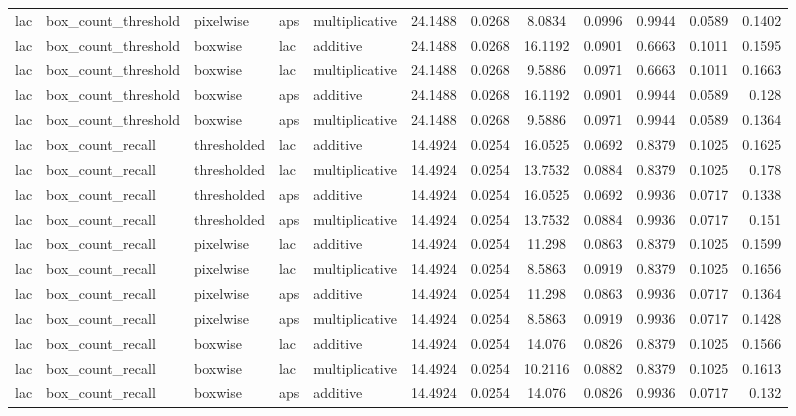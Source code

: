 \begin{table*}[htbp]
\begin{tabular}{@{}lllll rrcrrcr@{}}
lac & box\_count\_threshold & pixelwise & aps & multiplicative & 24.1488 & 0.0268 & 8.0834 & 0.0996 & 0.9944 & 0.0589 & 0.1402 \\
lac & box\_count\_threshold & boxwise & lac & additive & 24.1488 & 0.0268 & 16.1192 & 0.0901 & 0.6663 & 0.1011 & 0.1595 \\
lac & box\_count\_threshold & boxwise & lac & multiplicative & 24.1488 & 0.0268 & 9.5886 & 0.0971 & 0.6663 & 0.1011 & 0.1663 \\
lac & box\_count\_threshold & boxwise & aps & additive & 24.1488 & 0.0268 & 16.1192 & 0.0901 & 0.9944 & 0.0589 & 0.128 \\
lac & box\_count\_threshold & boxwise & aps & multiplicative & 24.1488 & 0.0268 & 9.5886 & 0.0971 & 0.9944 & 0.0589 & 0.1364 \\
lac & box\_count\_recall & thresholded & lac & additive & 14.4924 & 0.0254 & 16.0525 & 0.0692 & 0.8379 & 0.1025 & 0.1625 \\
lac & box\_count\_recall & thresholded & lac & multiplicative & 14.4924 & 0.0254 & 13.7532 & 0.0884 & 0.8379 & 0.1025 & 0.178 \\
lac & box\_count\_recall & thresholded & aps & additive & 14.4924 & 0.0254 & 16.0525 & 0.0692 & 0.9936 & 0.0717 & 0.1338 \\
lac & box\_count\_recall & thresholded & aps & multiplicative & 14.4924 & 0.0254 & 13.7532 & 0.0884 & 0.9936 & 0.0717 & 0.151 \\
lac & box\_count\_recall & pixelwise & lac & additive & 14.4924 & 0.0254 & 11.298 & 0.0863 & 0.8379 & 0.1025 & 0.1599 \\
lac & box\_count\_recall & pixelwise & lac & multiplicative & 14.4924 & 0.0254 & 8.5863 & 0.0919 & 0.8379 & 0.1025 & 0.1656 \\
lac & box\_count\_recall & pixelwise & aps & additive & 14.4924 & 0.0254 & 11.298 & 0.0863 & 0.9936 & 0.0717 & 0.1364 \\
lac & box\_count\_recall & pixelwise & aps & multiplicative & 14.4924 & 0.0254 & 8.5863 & 0.0919 & 0.9936 & 0.0717 & 0.1428 \\
lac & box\_count\_recall & boxwise & lac & additive & 14.4924 & 0.0254 & 14.076 & 0.0826 & 0.8379 & 0.1025 & 0.1566 \\
lac & box\_count\_recall & boxwise & lac & multiplicative & 14.4924 & 0.0254 & 10.2116 & 0.0882 & 0.8379 & 0.1025 & 0.1613 \\
lac & box\_count\_recall & boxwise & aps & additive & 14.4924 & 0.0254 & 14.076 & 0.0826 & 0.9936 & 0.0717 & 0.132 \\

\end{tabular}
\end{table*}
